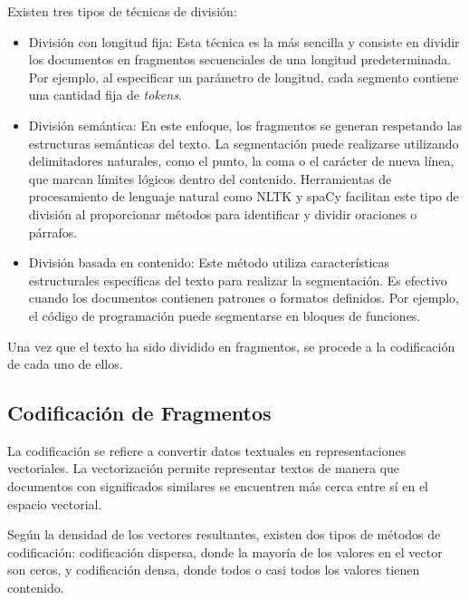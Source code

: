 Existen tres tipos de técnicas de división:
\begin{itemize}
    \item División con longitud fija: Esta técnica es la más sencilla y consiste en dividir los documentos en fragmentos secuenciales de una longitud predeterminada. Por ejemplo, al especificar un parámetro de longitud, cada segmento contiene una cantidad fija de \textit{tokens}.
    \item División semántica: En este enfoque, los fragmentos se generan respetando las estructuras semánticas del texto. La segmentación puede realizarse utilizando delimitadores naturales, como el punto, la coma o el carácter de nueva línea, que marcan límites lógicos dentro del contenido. Herramientas de procesamiento de lenguaje natural como NLTK \cite{nltk2001} y spaCy \cite{spacy2016} facilitan este tipo de división al proporcionar métodos para identificar y dividir oraciones o párrafos.
    \item División basada en contenido: Este método utiliza características estructurales específicas del texto para realizar la segmentación. Es efectivo cuando los documentos contienen patrones o formatos definidos. Por ejemplo, el código de programación puede segmentarse en bloques de funciones.
\end{itemize}

Una vez que el texto ha sido dividido en fragmentos, se procede a la codificación de cada uno de ellos.

\subsection{Codificación de Fragmentos}

La codificación se refiere a convertir datos textuales en representaciones vectoriales. La vectorización permite representar textos de manera que documentos con significados similares se encuentren más cerca entre sí en el espacio vectorial. 

Según la densidad de los vectores resultantes, existen dos tipos de métodos de codificación: codificación dispersa, donde la mayoría de los valores en el vector son ceros, y codificación densa, donde todos o casi todos los valores tienen contenido.

